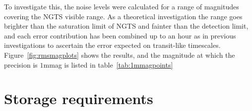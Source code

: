 \documentclass[11pt,a4paper]{report}
\begin{document}
To investigate this, the noise levels were calculated for a range of
magnitudes covering the NGTS visible range. As a theoretical
investigation the range goes brighter than the saturation limit of NGTS
and fainter than the detection limit, and each error contribution has
been combined up to an hour as in previous investigations to ascertain
the error expected on transit-like timescales.
Figure~\ref{fig:rmsmagplots} shows the results, and the magnitude at
which the precision is $1$mmag  is listed in table~\ref{tab:1mmagpoints}



\section{Storage requirements}



\end{document}
